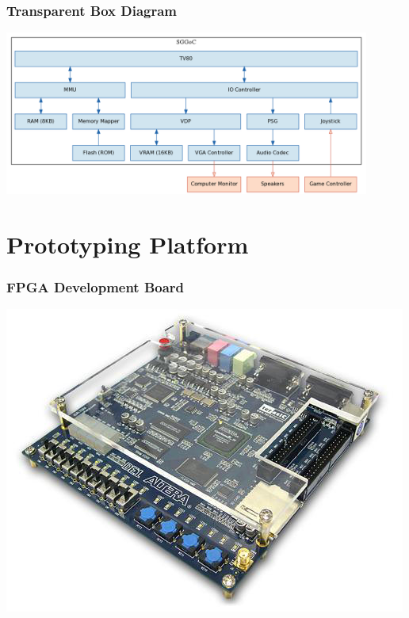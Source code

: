 \documentclass{beamer}
\begin{document}
\begin{frame}
    \frametitle{Transparent Box Diagram}
    \begin{center}
        \includegraphics[width=0.9\textwidth]{../block_diagrams/block_diagram_internal.png}
    \end{center}
\end{frame}

\section{Prototyping Platform}
\begin{frame}
    \frametitle{FPGA Development Board}
    \begin{center}
        \includegraphics[height=0.7\textheight]{de1_angle.jpg}
    \end{center}
\end{frame}
\end{document}
